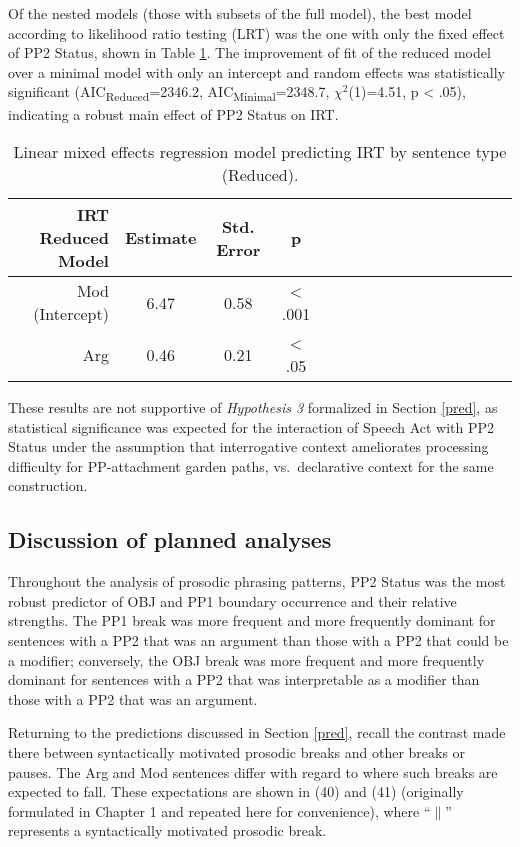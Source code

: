 \documentclass[11pt,oneside]{book}
\begin{document}
Of the nested models (those with subsets of the full model), the best model according to likelihood ratio testing (LRT) was the one with only the fixed effect of PP2 Status, shown in Table \ref{tab:redirt}. The improvement of fit of the reduced model over a minimal model with only an intercept and random effects was statistically significant (AIC\textsubscript{Reduced}=2346.2, AIC\textsubscript{Minimal}=2348.7, \(\chi^2\)(1)=4.51, p \textless{} .05), indicating a robust main effect of PP2 Status on IRT.

\begin{table}[!h]

\caption{\label{tab:redirt}Linear mixed effects regression model predicting IRT by sentence type (Reduced).}
\centering
\begin{tabular}{rcccrcccrcccrccc}
\toprule
IRT Reduced Model & Estimate & Std. Error & p\\
\midrule
Mod (Intercept) & 6.47 & 0.58 & < .001\\
Arg & 0.46 & 0.21 & < .05\\
\bottomrule
\end{tabular}
\end{table}

These results are not supportive of \emph{Hypothesis 3} formalized in Section \ref{pred}, as statistical significance was expected for the interaction of Speech Act with PP2 Status under the assumption that interrogative context ameliorates processing difficulty for PP-attachment garden paths, vs.~declarative context for the same construction.

\hypertarget{discussion-of-planned-analyses}{%
\subsection{Discussion of planned analyses}\label{discussion-of-planned-analyses}}

Throughout the analysis of prosodic phrasing patterns, PP2 Status was the most robust predictor of OBJ and PP1 boundary occurrence and their relative strengths. The PP1 break was more frequent and more frequently dominant for sentences with a PP2 that was an argument than those with a PP2 that could be a modifier; conversely, the OBJ break was more frequent and more frequently dominant for sentences with a PP2 that was interpretable as a modifier than those with a PP2 that was an argument.

Returning to the predictions discussed in Section \ref{pred}, recall the contrast made there between syntactically motivated prosodic breaks and other breaks or pauses. The Arg and Mod sentences differ with regard to where such breaks are expected to fall. These expectations are shown in (40) and (41) (originally formulated in Chapter 1 and repeated here for convenience), where ``\(\|\)'' represents a syntactically motivated prosodic break.
\end{document}
